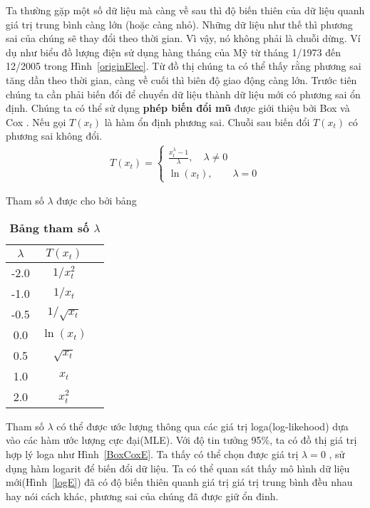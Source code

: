 Ta thường gặp một số dữ liệu mà càng về sau thì độ biến thiên của dữ liệu quanh giá trị trung bình càng lớn (hoặc càng nhỏ). Những dữ liệu như thế thì phương sai của chúng sẽ thay đổi theo thời gian. Vì vậy, nó không phải là chuỗi dừng. Ví dụ như biểu đồ lượng điện sử dụng hàng tháng của Mỹ từ tháng 1/1973 đến 12/2005 trong Hình~\ref{originElec}. Từ đồ thị chúng ta có thể thấy rằng phương sai tăng dần theo thời gian, càng về cuối thì biên độ giao động càng lớn. Trước tiên chúng ta cần phải biến đổi để chuyển dữ liệu thành dữ liệu mới có phương sai ổn định.
Chúng ta có thể sử dụng \textbf{phép biến đổi mũ} được giới thiệu bởi Box và Cox \citep{bc64}. Nếu gọi $T(x_t)$ là hàm ổn định phương sai. Chuỗi sau biến đổi $T(x_t)$ có phương sai không đổi. 
\begin{align}
	T(x_t) = \begin{cases}
				\frac{x_t^{\lambda}-1}{\lambda},\quad \lambda \neq 0 \\
				\ln(x_t),\qquad \lambda = 0
			\end{cases}
\end{align}

Tham số $\lambda$ được cho bởi bảng

\begin{table}[htdp]
\centering
\begin{tabular}{ccc} %
\hline
{\bf $\lambda$} & {\bf $T(x_t)$}  \\ 
\hline %

-2.0 & ${1}/{x_t^2}$  \\
-1.0 & ${1}/{x_t}$  \\
-0.5 & ${1}/{\sqrt{x_t}}$  \\
0.0  & $\ln(x_t)$  \\
0.5 & $\sqrt{x_t}$  \\
1.0 &  $x_t$ \\
2.0 &  $x_t^2$ \\
\end{tabular}
\caption[Bảng tham số $\lambda$]{\textbf{Bảng tham số $\lambda$}}
\label{lambda} %
\end{table}

Tham số $\lambda$ có thể được ước lượng thông qua các giá trị loga(log-likehood) dựa vào các hàm ước lượng cực đại(MLE). Với độ tin tưởng 95$\%$, ta có đồ thị giá trị hợp lý loga như Hình~\ref{BoxCoxE}. Ta thấy có thể chọn được giá trị $\lambda = 0$ , sử dụng hàm logarit để biến đổi dữ liệu. Ta có thể quan sát thấy mô hình dữ liệu mới(Hình~\ref{logE}) đã có độ biến thiên quanh giá trị giá trị trung bình đều nhau hay nói cách khác, phương sai của chúng đã được giữ ổn đinh.

